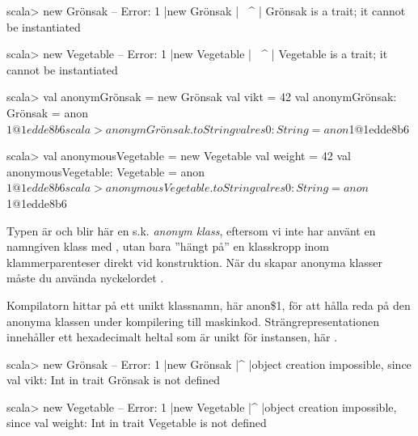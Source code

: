 \SubtaskSolved  
\ifswedish
\begin{REPLnonum}
scala> new Grönsak
-- Error:
1 |new Grönsak
  |    ^^^^^^^
  |    Grönsak is a trait; it cannot be instantiated
\end{REPLnonum}
\else
\begin{REPLnonum}
scala> new Vegetable
-- Error:
1 |new Vegetable
  |    ^^^^^^^
  |    Vegetable is a trait; it cannot be instantiated
\end{REPLnonum}
\fi

\SubtaskSolved  
\ifswedish
\begin{REPLnonum}
scala> val anonymGrönsak = new Grönsak { val vikt = 42 }
val anonymGrönsak: Grönsak = anon$1@1edde8b6
scala> anonymGrönsak.toString                                                                                      
val res0: String = anon$1@1edde8b6
\end{REPLnonum}
\else
\begin{REPLnonum}
scala> val anonymousVegetable = new Vegetable { val weight = 42 }
val anonymousVegetable: Vegetable = anon$1@1edde8b6
scala> anonymousVegetable.toString                                                                                      
val res0: String = anon$1@1edde8b6
\end{REPLnonum}
\fi
Typen är \ifswedish{}\else{}\fi{} och blir här en s.k. \emph{anonym klass}, eftersom vi inte har använt en namngiven klass med , utan bara ''hängt på'' en klasskropp inom klammerparenteser direkt vid konstruktion. När du skapar anonyma klasser måste du använda nyckelordet .

Kompilatorn hittar på ett unikt klassnamn, här anon\$1, för att hålla reda på den anonyma klassen under kompilering till maskinkod. Strängrepresentationen innehåller ett hexadecimalt heltal som är unikt för instansen, här .

\SubtaskSolved  

\ifswedish
\begin{REPLsmall}
scala> new Grönsak { }
-- Error:
1 |new Grönsak { }
  |^
  |object creation impossible, since val vikt: Int in trait Grönsak is not defined 

\end{REPLsmall}
\else
\begin{REPLsmall}
scala> new Vegetable { }
-- Error:
1 |new Vegetable { }
  |^
  |object creation impossible, since val weight: Int in trait Vegetable is not defined 

\end{REPLsmall}
\fi


